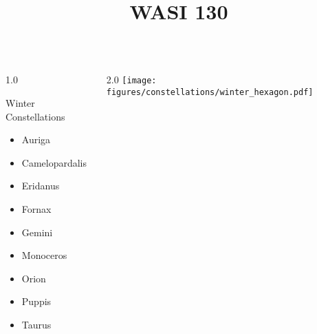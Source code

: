 \documentclass[final]{beamer}
\title{WASI 130}
\newlength{\colwidth}
\begin{document}
\begin{frame}[t]{}
  \begin{columns}[T]
      \begin{column}{1.0\colwidth}
      \Large
      \begin{block}{Winter Constellations}
      \begin{itemize}
          \item{Auriga}
          \item{Camelopardalis}
          \item{Eridanus}
          \item{Fornax}
          \item{Gemini}
          \item{Monoceros}
          \item{Orion}
          \item{Puppis}
          \item{Taurus}
      \end{itemize}
      \end{block}
  \end{column}
      \begin{column}{2.0\colwidth}
          \centering
          \texttt{[image: figures/constellations/winter\_hexagon.pdf]}
      \end{column}
  \end{columns}
\end{frame}

\end{document}
